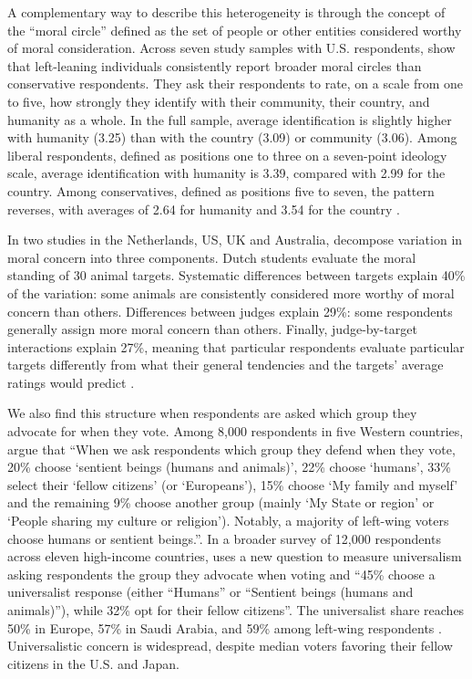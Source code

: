 \documentclass[11pt,a4paper]{article}
\begin{document}
A complementary way to describe this heterogeneity is through the concept of the ``moral circle'' defined as the set of people or other entities considered worthy of moral consideration.
Across seven study samples with U.S. respondents, \citet{waytz_ideological_2019} show that left-leaning individuals consistently report broader moral circles than conservative respondents. They ask their respondents to rate, on a scale from one to five, how strongly they identify with their community, their country, and humanity as a whole. In the full sample, average identification is slightly higher with humanity (3.25) than with the country (3.09) or community (3.06). Among liberal respondents, defined as positions one to three on a seven-point ideology scale, average identification with humanity is 3.39, compared with 2.99 for the country. Among conservatives, defined as positions five to seven, the pattern reverses, with averages of 2.64 for humanity and 3.54 for the country \citep[Figure 3]{waytz_ideological_2019}. 

In two studies in the Netherlands, US, UK and Australia, \citet{jaeger_relative_2023} decompose variation in moral concern into three components. Dutch students evaluate the moral standing of 30 animal targets. Systematic differences between targets explain 40\% of the variation: some animals are consistently considered more worthy of moral concern than others. Differences between judges explain 29\%: some respondents generally assign more moral concern than others. Finally, judge-by-target interactions explain 27\%, meaning that particular respondents evaluate particular targets differently from what their general tendencies and the targets' average ratings would predict \citep[Figures 1]{jaeger_relative_2023}.

We also find this structure when respondents are asked which group they advocate for when they vote. Among 8,000 respondents in five Western countries, \citet{fabre_majority_2025} argue that ``When we ask respondents which group they defend when they vote, 20\% choose ‘sentient beings (humans and animals)’, 22\% choose ‘humans’, 33\% select their ‘fellow citizens’ (or ‘Europeans’), 15\% choose ‘My family and myself’ and the remaining 9\% choose another group (mainly ‘My State or region’ or ‘People sharing my culture or religion’). Notably, a majority of left-wing voters choose humans or sentient beings.''. In a broader survey of 12,000 respondents across eleven 
high-income 
countries, \citet{fabre_public_2026} uses a new question to measure universalism asking respondents the group they advocate when voting and ``45\% choose a universalist  response (either “Humans” or “Sentient beings (humans and animals)”), while 32\% opt for their fellow citizens''. The universalist share reaches 50\% in Europe, 57\% in Saudi Arabia, and 59\% among left-wing respondents \citep{fabre_public_2026}. Universalistic concern is widespread, despite median voters favoring their fellow citizens in the U.S. and Japan.
\end{document}
